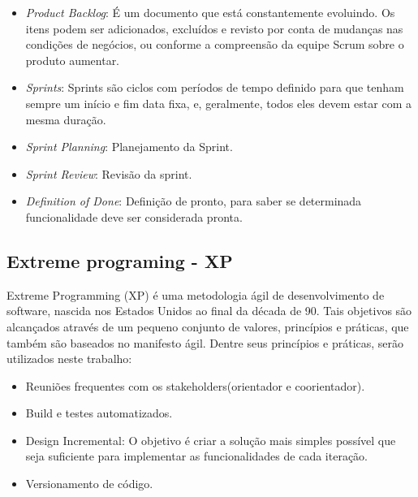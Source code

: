   \begin{itemize}                                                               
  \item \textit{Product Backlog}: É um documento que está constantemente evoluindo.
  Os itens podem ser adicionados, excluídos e revisto por conta de mudanças nas 
  condições de negócios, ou conforme a compreensão da equipe Scrum sobre o produto
   aumentar.                                                                    
  \cite{mindmasterScrum}                                                        
  \item \textit{Sprints}: Sprints são ciclos com períodos de tempo definido  para
   que tenham sempre um início e fim data fixa, e, geralmente, todos eles devem 
   estar com a mesma duração.                                                   
  \cite{mindmasterScrum}                                                        
  \item \textit{Sprint Planning}: Planejamento da Sprint.                       
  \item \textit{Sprint Review}: Revisão da sprint.                              
  \item \textit{Definition of Done}: Definição de pronto, para saber se determinada
  funcionalidade deve ser considerada pronta.                                   
  \cite{mindmasterScrum}                                                        
  \end{itemize}

\subsection{Extreme programing - XP}
\label{Sec:xp}
Extreme Programming (XP) é uma metodologia ágil de desenvolvimento de software, 
nascida nos Estados Unidos ao final da década de 90. Tais objetivos são 
alcançados através de um pequeno conjunto de valores, princípios
 e práticas, que também são baseados no manifesto ágil. Dentre seus princípios 
e práticas, serão utilizados neste trabalho: 

  \begin{itemize}
  \item Reuniões frequentes com os stakeholders(orientador e coorientador).     
  \item Build e testes automatizados.
  \cite{praticaXp}
  \item Design Incremental: O objetivo é criar a solução mais simples possível 
  que seja suficiente para implementar as funcionalidades de cada iteração.
  \cite{praticaXp}                                                        
  \item Versionamento de código.
  \cite{praticaXp}                                                        
  \end{itemize}                                                                 
  

